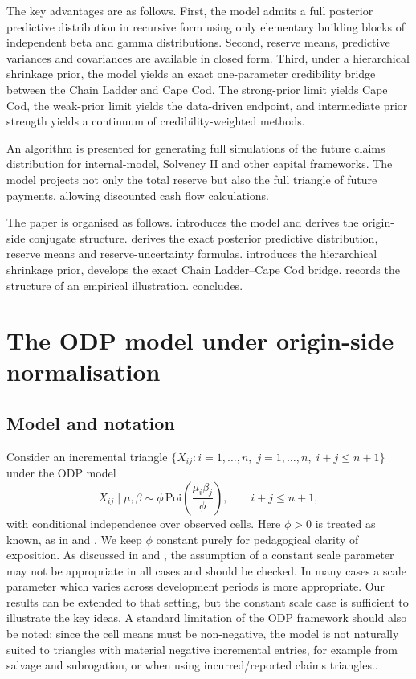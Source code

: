 \documentclass[11pt]{article}
\newcommand{\1}{\mathbf{1}}
\begin{document}
The key advantages are as follows. First, the model admits a full posterior predictive distribution in recursive form using only elementary building blocks of independent beta and gamma distributions. 
Second, reserve means, predictive variances and covariances are available in closed form. Third, under a hierarchical shrinkage prior, the model yields
an exact one-parameter credibility bridge between the Chain Ladder and Cape Cod. The strong-prior limit yields 
Cape Cod, the weak-prior limit yields the data-driven endpoint, and intermediate prior strength yields a 
continuum of credibility-weighted methods. 

An algorithm is presented for generating full simulations of the future claims distribution for internal-model, Solvency II and other capital frameworks. 
The model projects not only the total 
reserve but also the full triangle of future payments, allowing discounted cash flow calculations. 

The paper is organised as follows.  introduces the model and derives the origin-side conjugate structure.  derives the exact posterior predictive distribution, reserve means and reserve-uncertainty formulas. 
 introduces the hierarchical shrinkage prior, develops the exact Chain Ladder--Cape Cod 
bridge.  records the structure of an empirical illustration.  concludes.

\section{The ODP model under origin-side normalisation}\label{sec:model}

\subsection{Model and notation}

Consider an incremental triangle $\{X_{ij}: i=1,\dots,n,\; j=1,\dots,n,\; i+j\le n+1\}$ under the ODP model
\begin{equation}
X_{ij}\mid \mu,\beta \sim \phi\,\mathrm{Poi}\!\left(\frac{\mu_i\beta_j}{\phi}\right),
\qquad i+j\le n+1,
\label{eq:odp_model}
\end{equation}
with conditional independence over observed cells. Here $\phi>0$ is treated as known, as in \citet{EnglandVerrall2006} and \citet{Norman2025ODP}. We keep $\phi$ constant purely for pedagogical clarity of exposition. As discussed in \citet{EnglandVerrall2006} and 
\citet{Saluz2015CapeCod}, the assumption of a constant scale parameter may not be appropriate in all cases and should be checked. In many cases a scale parameter which varies across development periods is more appropriate. Our results can be extended to that setting, 
but the constant scale case is sufficient to illustrate the key ideas. A standard limitation of the ODP framework should also be noted: since the cell means must be non-negative, the model is not naturally suited to triangles with material negative 
incremental entries, for example from salvage and subrogation, or when using incurred/reported claims triangles.. 
\end{document}
